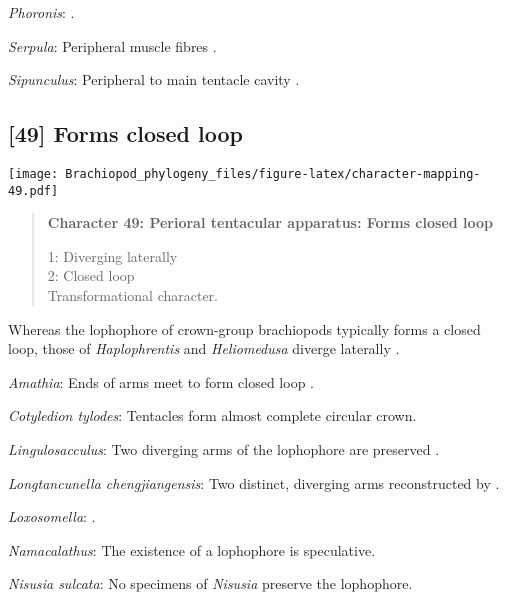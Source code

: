 \documentclass[openany]{book}
\theoremstyle{definition}
\theoremstyle{definition}
\theoremstyle{definition}
\theoremstyle{remark}
\begin{document}
\hypertarget{Phoronis-coding-48}{}
\emph{Phoronis}: \citep{Pardos1991}.

\hypertarget{Serpula-coding-48}{}
\emph{Serpula}: Peripheral muscle fibres \citep{Hanson1949}.

\hypertarget{Sipunculus-coding-48}{}
\emph{Sipunculus}: Peripheral to main tentacle cavity
\citep{Pilger1982}.

\subsection*{{[}49{]} Forms closed loop}\label{forms-closed-loop}

\texttt{[image: Brachiopod\_phylogeny\_files/figure-latex/character-mapping-49.pdf]}

\begin{quote}
\textbf{Character 49: Perioral tentacular apparatus: Forms closed loop}

1: Diverging laterally\\
2: Closed loop\\
Transformational character.
\end{quote}

Whereas the lophophore of crown-group brachiopods typically forms a
closed loop, those of \emph{Haplophrentis} and \emph{Heliomedusa}
diverge laterally \citep{Moysiuk2017Hyolithsare}.

\hypertarget{Amathia-coding-49}{}
\emph{Amathia}: Ends of arms meet to form closed loop
\citep{Temereva2016Thenervous}.

\hypertarget{Cotyledion_tylodes-coding-49}{}
\emph{Cotyledion tylodes}: Tentacles form almost complete circular
crown.

\hypertarget{Lingulosacculus-coding-49}{}
\emph{Lingulosacculus}: Two diverging arms of the lophophore are
preserved \citep{Balthasar2009EarlyCambrian}.

\hypertarget{Longtancunella_chengjiangensis-coding-49}{}
\emph{Longtancunella chengjiangensis}: Two distinct, diverging arms
reconstructed by \citet{Zhang2007Agregarious}.

\hypertarget{Loxosomella-coding-49}{}
\emph{Loxosomella}: \citet{Nielsen1966}.

\hypertarget{Namacalathus-coding-49}{}
\emph{Namacalathus}: The existence of a lophophore is speculative.

\hypertarget{Nisusia_sulcata-coding-49}{}
\emph{Nisusia sulcata}: No specimens of \emph{Nisusia} preserve the
lophophore.
\end{document}
